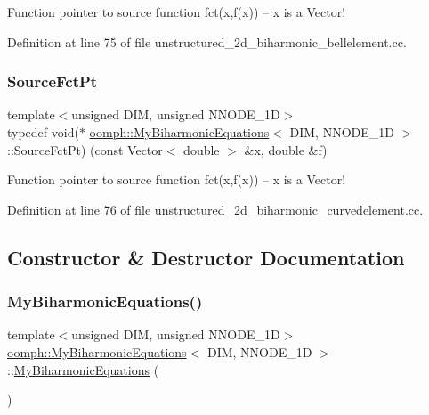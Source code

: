 Function pointer to source function fct(x,f(x)) -- x is a Vector! 



Definition at line 75 of file unstructured\+\_\+2d\+\_\+biharmonic\+\_\+bellelement.\+cc.

\mbox{\label{classoomph_1_1MyBiharmonicEquations_a17bd58054c66229016eb1c52eab36bc1}} 
\subsubsection{\texorpdfstring{Source\+Fct\+Pt}{SourceFctPt}\hspace{0.1cm}{\footnotesize\ttfamily [2/2]}}
{\footnotesize\ttfamily template$<$unsigned D\+IM, unsigned N\+N\+O\+D\+E\+\_\+1D$>$ \\
typedef void($\ast$ \hyperlink{classoomph_1_1MyBiharmonicEquations}{oomph\+::\+My\+Biharmonic\+Equations}$<$ D\+IM, N\+N\+O\+D\+E\+\_\+1D $>$\+::Source\+Fct\+Pt) (const Vector$<$ double $>$ \&x, double \&f)}



Function pointer to source function fct(x,f(x)) -- x is a Vector! 



Definition at line 76 of file unstructured\+\_\+2d\+\_\+biharmonic\+\_\+curvedelement.\+cc.



\subsection{Constructor \& Destructor Documentation}
\mbox{\label{classoomph_1_1MyBiharmonicEquations_ab5084decf9d75cee91f0e88fb4f62c86}} 
\subsubsection{\texorpdfstring{My\+Biharmonic\+Equations()}{MyBiharmonicEquations()}\hspace{0.1cm}{\footnotesize\ttfamily [1/4]}}
{\footnotesize\ttfamily template$<$unsigned D\+IM, unsigned N\+N\+O\+D\+E\+\_\+1D$>$ \\
\hyperlink{classoomph_1_1MyBiharmonicEquations}{oomph\+::\+My\+Biharmonic\+Equations}$<$ D\+IM, N\+N\+O\+D\+E\+\_\+1D $>$\+::\hyperlink{classoomph_1_1MyBiharmonicEquations}{My\+Biharmonic\+Equations} (\begin{DoxyParamCaption}{ }\end{DoxyParamCaption})\hspace{0.3cm}{\ttfamily [inline]}}



